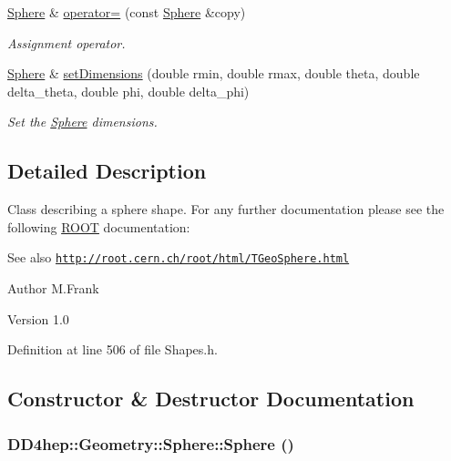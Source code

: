 \begin{DoxyCompactItemize}
\hyperlink{class_d_d4hep_1_1_geometry_1_1_sphere}{Sphere} \& \hyperlink{class_d_d4hep_1_1_geometry_1_1_sphere_a23b08fc1a799d20f1a66e58611c1084d}{operator=} (const \hyperlink{class_d_d4hep_1_1_geometry_1_1_sphere}{Sphere} \&copy)
\begin{DoxyCompactList}\small\item\em Assignment operator. \item\end{DoxyCompactList}\item 
\hyperlink{class_d_d4hep_1_1_geometry_1_1_sphere}{Sphere} \& \hyperlink{class_d_d4hep_1_1_geometry_1_1_sphere_a0c80e5f5655ed0211c769d9193461d79}{setDimensions} (double rmin, double rmax, double theta, double delta\_\-theta, double phi, double delta\_\-phi)
\begin{DoxyCompactList}\small\item\em Set the \hyperlink{class_d_d4hep_1_1_geometry_1_1_sphere}{Sphere} dimensions. \item\end{DoxyCompactList}\end{DoxyCompactItemize}


\subsection{Detailed Description}
Class describing a sphere shape. For any further documentation please see the following \hyperlink{namespace_r_o_o_t}{ROOT} documentation: \begin{DoxySeeAlso}{See also}
\href{http://root.cern.ch/root/html/TGeoSphere.html}{\tt http://root.cern.ch/root/html/TGeoSphere.html}
\end{DoxySeeAlso}
\begin{DoxyAuthor}{Author}
M.Frank 
\end{DoxyAuthor}
\begin{DoxyVersion}{Version}
1.0 
\end{DoxyVersion}


Definition at line 506 of file Shapes.h.

\subsection{Constructor \& Destructor Documentation}
\hypertarget{class_d_d4hep_1_1_geometry_1_1_sphere_a4dd4b0ac58f50a79d4fdae6e296ffec7}{
\subsubsection[{Sphere}]{\setlength{\rightskip}{0pt plus 5cm}DD4hep::Geometry::Sphere::Sphere ()}}
\label{class_d_d4hep_1_1_geometry_1_1_sphere_a4dd4b0ac58f50a79d4fdae6e296ffec7}


